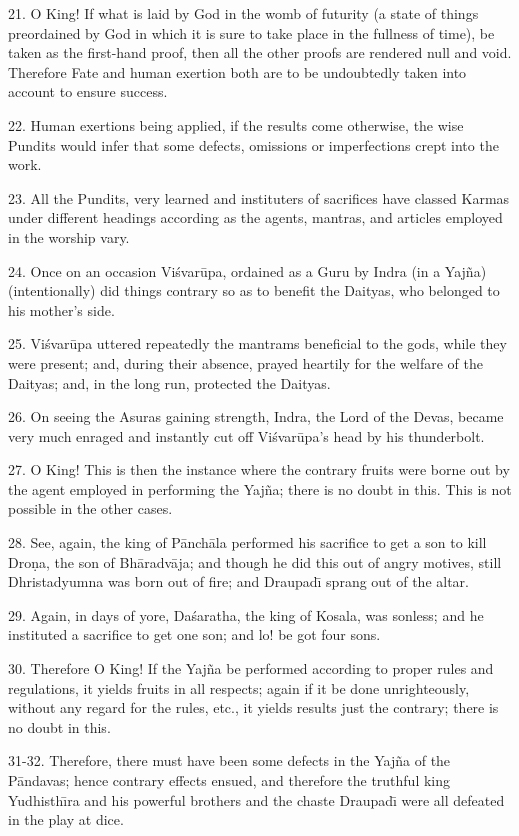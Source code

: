 21. O King! If what is laid by God in the womb of futurity (a state of things preordained by God in which it is sure to take place in the fullness of time), be taken as the first-hand proof, then all the other proofs are rendered null and void. Therefore Fate and human exertion both are to be undoubtedly taken into account to ensure success.

22. Human exertions being applied, if the results come otherwise, the wise Pundits would infer that some defects, omissions or imperfections crept into the work.

23. All the Pundits, very learned and instituters of sacrifices have classed Karmas under different headings according as the agents, mantras, and articles employed in the worship vary.

24. Once on an occasion Vi\'svar\=upa, ordained as a Guru by Indra (in a Yaj\~na) (intentionally) did things contrary so as to benefit the Daityas, who belonged to his mother's side.

25. Vi\'svar\=upa uttered repeatedly the mantrams beneficial to the gods, while they were present; and, during their absence, prayed heartily for the welfare of the Daityas; and, in the long run, protected the Daityas.

26. On seeing the Asuras gaining strength, Indra, the Lord of the Devas, became very much enraged and instantly cut off Vi\'svar\=upa's head by his thunderbolt.

27. O King! This is then the instance where the contrary fruits were borne out by the agent employed in performing the Yaj\~na; there is no doubt in this. This is not possible in the other cases.

28. See, again, the king of P\=anch\=ala performed his sacrifice to get a son to kill Dro\d{n}a, the son of Bh\=aradv\=aja; and though he did this out of angry motives, still Dhristadyumna was born out of fire; and Draupad\={\i} sprang out of the altar.

29. Again, in days of yore, Da\'saratha, the king of Kosala, was sonless; and he instituted a sacrifice to get one son; and lo! be got four sons.

30. Therefore O King! If the Yaj\~na be performed according to proper rules and regulations, it yields fruits in all respects; again if it be done unrighteously, without any regard for the rules, etc., it yields results just the contrary; there is no doubt in this.

31-32. Therefore, there must have been some defects in the Yaj\~na of the P\=andavas; hence contrary effects ensued, and therefore the truthful king Yudhisth\={\i}ra and his powerful brothers and the chaste Draupad\={\i} were all defeated in the play at dice.

